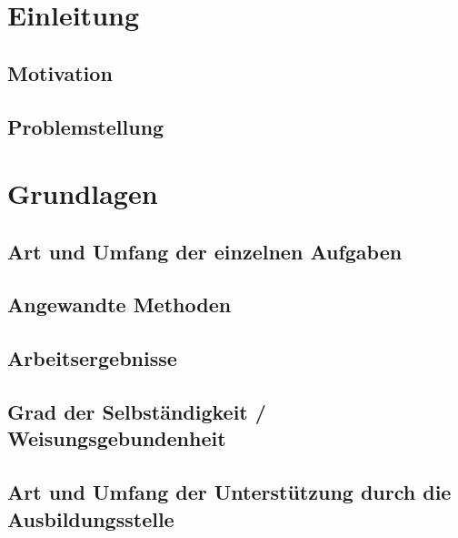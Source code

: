 \documentclass[
fontsize=10pt, 
listof = totoc,
parskip = half	
]{report}
\begin{document}
\chapter{Einleitung}

\section{Motivation}

\section{Problemstellung}

\newpage

\chapter{Grundlagen}

\section{Art und Umfang der einzelnen Aufgaben}

\section{Angewandte Methoden}

\section{Arbeitsergebnisse}

\section{Grad der Selbständigkeit / Weisungsgebundenheit}

\section{Art und Umfang der Unterstützung durch die Ausbildungsstelle}
\end{document}
